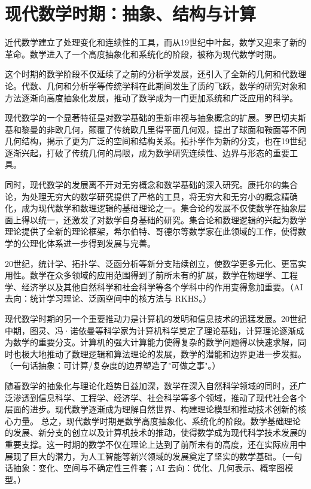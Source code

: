 \section{现代数学时期：抽象、结构与计算}
近代数学建立了处理变化和连续性的工具，而从19世纪中叶起，数学又迎来了新的革命。数学进入了一个高度抽象化和系统化的阶段，被称为现代数学时期。

这个时期的数学阶段不仅延续了之前的分析学发展，还引入了全新的几何和代数理论。代数、几何和分析学等传统学科在此期间发生了质的飞跃，数学的研究对象和方法逐渐向高度抽象化发展，推动了数学成为一门更加系统和广泛应用的科学。

现代数学的一个显著特征是对数学基础的重新审视与抽象概念的扩展。罗巴切夫斯基和黎曼的非欧几何，颠覆了传统欧几里得平面几何观，提出了球面和鞍面等不同几何结构，揭示了更为广泛的空间和结构关系。拓扑学作为新的分支，也在19世纪逐渐兴起，打破了传统几何的局限，成为数学研究连续性、边界与形态的重要工具。

同时，现代数学的发展离不开对无穷概念和数学基础的深入研究。康托尔的集合论，为处理无穷大的数学研究提供了严格的工具，将无穷大和无穷小的概念精确化，成为现代数学和数理逻辑的基础理论之一。集合论的发展不仅使数学在抽象层面上得以统一，还激发了对数学自身基础的研究。集合论和数理逻辑的兴起为数学理论提供了全新的理论框架，希尔伯特、哥德尔等数学家在此领域的工作，使得数学的公理化体系进一步得到发展与完善。

20世纪，统计学、拓扑学、泛函分析等新分支陆续创立，使数学更多元化、更富实用性。数学在众多领域的应用范围得到了前所未有的扩展，数学在物理学、工程学、经济学以及其他自然科学和社会科学等各个学科中的作用变得愈加重要。{（AI 去向：统计学习理论、泛函空间中的核方法与 RKHS。）}

现代数学时期的另一个重要推动力是计算机的发明和信息技术的迅猛发展。20世纪中期，图灵、冯·诺依曼等科学家为计算机科学奠定了理论基础，计算理论逐渐成为数学的重要分支。计算机的强大计算能力使得复杂的数学问题得以快速求解，同时也极大地推动了数理逻辑和算法理论的发展，数学的潜能和边界更进一步发掘。{（一句话抽象：可计算/复杂度的边界塑造了"可做之事"。）}

随着数学的抽象化与理论化趋势日益加深，数学在深入自然科学领域的同时，还广泛渗透到信息科学、工程学、经济学、社会科学等多个领域，推动了现代社会各个层面的进步。现代数学逐渐成为理解自然世界、构建理论模型和推动技术创新的核心力量。
总之，现代数学时期是数学高度抽象化、系统化的阶段。数学基础理论的发展、新分支的创立以及计算机技术的推动，使得数学成为现代科学技术发展的重要支撑。这一时期的数学不仅在理论上达到了前所未有的高度，还在实际应用中展现了巨大的潜力，为人工智能等新兴领域的发展奠定了坚实的数学基础。{（一句话抽象：变化、空间与不确定性三件套；AI 去向：优化、几何表示、概率图模型。）}

